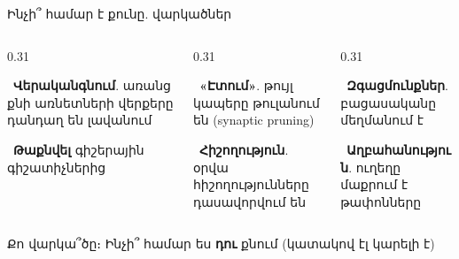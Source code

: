\begin{frame}{Ինչի՞ համար է քունը. վարկածներ}
  \begin{columns}[T]
    \begin{column}{0.31\textwidth}
      \begin{card}[hyp, colback=mint!30!cardwhite]\ \textbf{Վերականգնում}. առանց քնի առնետների վերքերը դանդաղ են լավանում\end{card}
      \begin{card}[hyp, colback=mint!30!cardwhite]\ \textbf{Թաքնվել} գիշերային գիշատիչներից\end{card}
    \end{column}
    \begin{column}{0.31\textwidth}
      \begin{card}[hyp, colback=lavender!35!cardwhite]\ \textbf{«Էտում»}. թույլ կապերը թուլանում են (synaptic pruning)\end{card}
      \begin{card}[hyp, colback=lavender!35!cardwhite]\ \textbf{Հիշողություն}. օրվա հիշողությունները դասավորվում են\end{card}
    \end{column}
    \begin{column}{0.31\textwidth}
      \begin{card}[hyp, colback=peach!35!cardwhite]\ \textbf{Զգացմունքներ}. բացասականը մեղմանում է\end{card}
      \begin{card}[hyp, colback=peach!35!cardwhite]\ \textbf{Աղբահանություն}. ուղեղը մաքրում է թափոնները\end{card}
    \end{column}
  \end{columns}
  \begin{chatbox}
    Քո վարկա՞ծը։ Ինչի՞ համար ես \textbf{դու} քնում (կատակով էլ կարելի է)
  \end{chatbox}
\end{frame}

